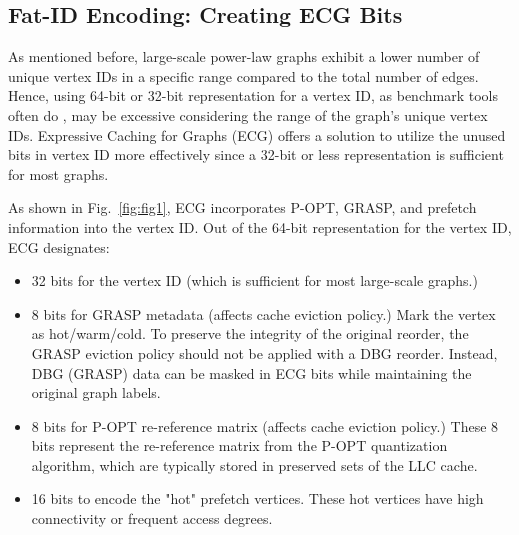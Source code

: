 \documentclass[conference]{IEEEtran}
\begin{document}
\subsection{Fat-ID Encoding: Creating ECG Bits}


As mentioned before, large-scale power-law graphs exhibit a lower number of unique vertex IDs in a specific range compared to the total number of edges. Hence, using 64-bit or 32-bit representation for a vertex ID, as benchmark tools often do \cite{beamer_gap_2017}, may be excessive considering the range of the graph's unique vertex IDs. Expressive Caching for Graphs (ECG) offers a solution to utilize the unused bits in vertex ID more effectively since a 32-bit or less representation is sufficient for most graphs.

As shown in Fig.~\ref{fig:fig1}, ECG incorporates P-OPT, GRASP, and prefetch information into the vertex ID. Out of the 64-bit representation for the vertex ID, ECG designates:
\begin{itemize}[topsep=2pt,itemsep=0pt,wide]
    \item 32 bits for the vertex ID (which is sufficient for most large-scale graphs.)
    \item 8 bits for GRASP metadata (affects cache eviction policy.) Mark the vertex as hot/warm/cold. To preserve the integrity of the original reorder, the GRASP eviction policy should not be applied with a DBG reorder. Instead, DBG (GRASP) data can be masked in ECG bits while maintaining the original graph labels.
    \item 8 bits for P-OPT re-reference matrix (affects cache eviction policy.) These 8 bits represent the re-reference matrix from the P-OPT quantization algorithm, which are typically stored in preserved sets of the LLC cache.
    \item 16 bits to encode the "hot" prefetch vertices. These hot vertices have high connectivity or frequent access degrees.
\end{itemize}
\end{document}
